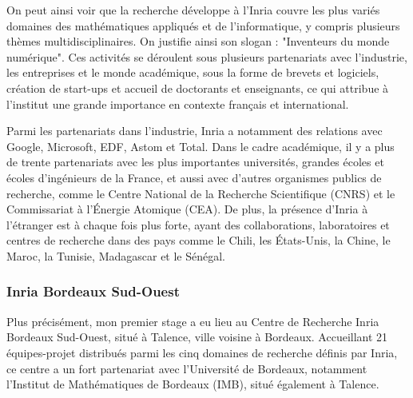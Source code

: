 \indent On peut ainsi voir que la recherche développe à l'Inria couvre les plus variés domaines des mathématiques appliqués et de l'informatique, y compris plusieurs thèmes multidisciplinaires. On justifie ainsi son slogan : "Inventeurs du monde numérique". Ces activités se déroulent sous plusieurs partenariats avec l'industrie, les entreprises et le monde académique, sous la forme de brevets et logiciels, création de start-ups et accueil de doctorants et enseignants, ce qui attribue à l'institut une grande importance en contexte français et international.

\indent Parmi les partenariats dans l'industrie, Inria a notamment des relations avec Google, Microsoft, EDF, Astom et Total. Dans le cadre académique, il y a plus de trente partenariats avec les plus importantes universités, grandes écoles et écoles d'ingénieurs de la France, et aussi avec d'autres organismes publics de recherche, comme le Centre National de la Recherche Scientifique (CNRS) et le Commissariat à l'Énergie Atomique (CEA). De plus, la présence d'Inria à l'étranger est à chaque fois plus forte, ayant des collaborations, laboratoires et centres de recherche dans des pays comme le Chili, les États-Unis, la Chine, le Maroc, la Tunisie, Madagascar et le Sénégal.


\subsubsection{Inria Bordeaux Sud-Ouest}

\indent Plus précisément, mon premier stage a eu lieu au Centre de Recherche Inria Bordeaux Sud-Ouest, situé à Talence, ville voisine à Bordeaux. Accueillant 21 équipes-projet distribués parmi les cinq domaines de recherche définis par Inria, ce centre a un fort partenariat avec l'Université de Bordeaux, notamment l'Institut de Mathématiques de Bordeaux (IMB), situé également à Talence.

